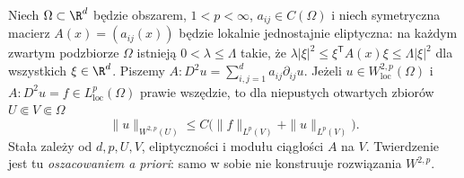 \begin{twierdzenie}
\label{thm:pde16-variable}
Niech $\Omega\subset\R^d$ będzie obszarem, $1<p<\infty$,
$a_{ij}\in C(\Omega)$ i niech symetryczna macierz
$A(x)=(a_{ij}(x))$ będzie lokalnie jednostajnie eliptyczna:
na każdym zwartym podzbiorze $\Omega$ istnieją
$0<\lambda\le\Lambda$ takie, że
$\lambda|\xi|^2\le\xi^{\mathsf T}A(x)\xi\le\Lambda|\xi|^2$
dla wszystkich $\xi\in\R^d$.
Piszemy $A:D^2u=\sum_{i,j=1}^d a_{ij}\partial_{ij}u$.
Jeżeli $u\in W^{2,p}_{\mathrm{loc}}(\Omega)$ i
$A:D^2u=f\in L^p_{\mathrm{loc}}(\Omega)$ prawie wszędzie,
to dla niepustych otwartych zbiorów $U\Subset V\Subset\Omega$
\begin{equation}\label{eq:pde16-variable}
 \|u\|_{W^{2,p}(U)}\le C\bigl(
 \|f\|_{L^p(V)}+\|u\|_{L^p(V)}\bigr).
\end{equation}
Stała zależy od $d,p,U,V$, eliptyczności i modułu ciągłości $A$
na $V$. Twierdzenie jest tu \emph{oszacowaniem a priori}: samo
w sobie nie konstruuje rozwiązania $W^{2,p}$.
\end{twierdzenie}
